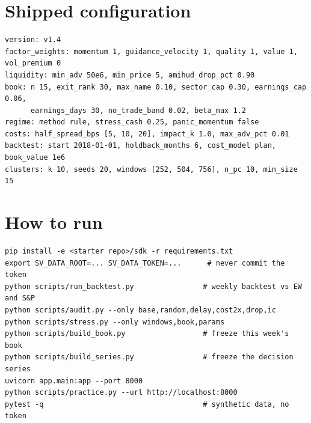 \documentclass[11pt]{article}
\begin{document}
\section{Shipped configuration}
\begin{lstlisting}
version: v1.4
factor_weights: momentum 1, guidance_velocity 1, quality 1, value 1, vol_premium 0
liquidity: min_adv 50e6, min_price 5, amihud_drop_pct 0.90
book: n 15, exit_rank 30, max_name 0.10, sector_cap 0.30, earnings_cap 0.06,
      earnings_days 30, no_trade_band 0.02, beta_max 1.2
regime: method rule, stress_cash 0.25, panic_momentum false
costs: half_spread_bps [5, 10, 20], impact_k 1.0, max_adv_pct 0.01
backtest: start 2018-01-01, holdback_months 6, cost_model plan, book_value 1e6
clusters: k 10, seeds 20, windows [252, 504, 756], n_pc 10, min_size 15
\end{lstlisting}

\section{How to run}
\begin{lstlisting}
pip install -e <starter repo>/sdk -r requirements.txt
export SV_DATA_ROOT=... SV_DATA_TOKEN=...      # never commit the token
python scripts/run_backtest.py                # weekly backtest vs EW and S&P
python scripts/audit.py --only base,random,delay,cost2x,drop,ic
python scripts/stress.py --only windows,book,params
python scripts/build_book.py                  # freeze this week's book
python scripts/build_series.py                # freeze the decision series
uvicorn app.main:app --port 8000
python scripts/practice.py --url http://localhost:8000
pytest -q                                     # synthetic data, no token
\end{lstlisting}
\end{document}
